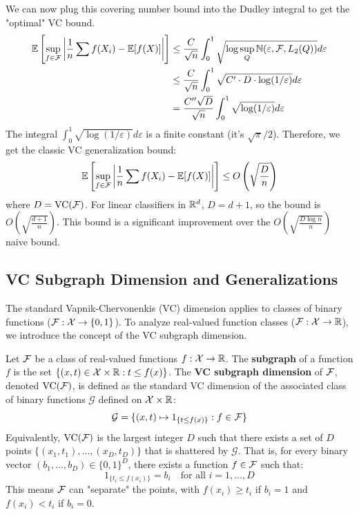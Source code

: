 \begin{remark}
    We can now plug this covering number bound into the Dudley integral to get the "optimal" VC bound.
\begin{align*}
\mathbb{E}\left[ \sup_{f \in \mathcal{F}} \left| \frac{1}{n} \sum f(X_i) - \mathbb{E}[f(X)] \right| \right] &\le \frac{C}{\sqrt{n}} \int_0^1 \sqrt{\log \sup_Q \mathbb{N}(\varepsilon, \mathcal{F}, L_2(Q))} d\varepsilon \\
&\le \frac{C}{\sqrt{n}} \int_0^1 \sqrt{C' \cdot D \cdot \log(1/\varepsilon)} d\varepsilon \\
&= \frac{C'' \sqrt{D}}{\sqrt{n}} \int_0^1 \sqrt{\log(1/\varepsilon)} d\varepsilon
\end{align*}
The integral $\int_0^1 \sqrt{\log(1/\varepsilon)} d\varepsilon$ is a finite constant (it's $\sqrt{\pi}/2$).
Therefore, we get the classic VC generalization bound:
$$
\mathbb{E}\left[ \sup_{f \in \mathcal{F}} \left| \frac{1}{n} \sum f(X_i) - \mathbb{E}[f(X)] \right| \right] \le O\left(\sqrt{\frac{D}{n}}\right)
$$
where $D = \text{VC}(\mathcal{F})$. For linear classifiers in $\mathbb{R}^d$, $D = d+1$, so the bound is $O\left(\sqrt{\frac{d+1}{n}}\right)$.
This bound is a significant improvement over the $O\left(\sqrt{\frac{D \log n}{n}}\right)$ naive bound.
\end{remark}
\subsection{VC Subgraph Dimension and Generalizations}
The standard Vapnik-Chervonenkis (VC) dimension applies to classes of binary functions ($\mathcal{F}: \mathcal{X} \to \{0, 1\}$). To analyze real-valued function classes ($\mathcal{F}: \mathcal{X} \to \mathbb{R}$), we introduce the concept of the VC subgraph dimension.

\begin{de}
Let $\mathcal{F}$ be a class of real-valued functions $f: \mathcal{X} \to \mathbb{R}$. The \textbf{subgraph} of a function $f$ is the set $\{(x, t) \in \mathcal{X} \times \mathbb{R} : t \le f(x)\}$.
The \textbf{VC subgraph dimension} of $\mathcal{F}$, denoted $\text{VC}(\mathcal{F})$, is defined as the standard VC dimension of the associated class of binary functions $\mathcal{G}$ defined on $\mathcal{X} \times \mathbb{R}$:
$$
\mathcal{G} = \{ (x, t) \mapsto 1_{\{t \le f(x)\}} : f \in \mathcal{F} \}
$$
Equivalently, $\text{VC}(\mathcal{F})$ is the largest integer $D$ such that there exists a set of $D$ points $\{(x_1, t_1), \dots, (x_D, t_D)\}$ that is shattered by $\mathcal{G}$. That is, for every binary vector $(b_1, \dots, b_D) \in \{0, 1\}^D$, there exists a function $f \in \mathcal{F}$ such that:
$$
1_{\{t_i \le f(x_i)\}} = b_i \quad \text{for all } i=1, \dots, D
$$
This means $\mathcal{F}$ can "separate" the points, with $f(x_i) \ge t_i$ if $b_i=1$ and $f(x_i) < t_i$ if $b_i=0$.
\end{de}


